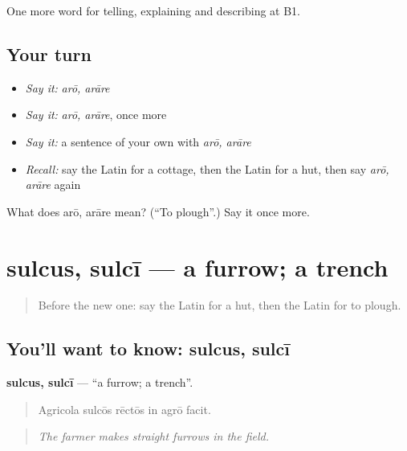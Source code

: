\begin{grammarlens}[title={What you've built}]
One more word for telling, explaining and describing at B1.
\end{grammarlens}

\subsection*{Your turn}
\begin{itemize}
\raggedright
  \item \emph{Say it:} \emph{arō, arāre}
  \item \emph{Say it:} \emph{arō, arāre}, once more
  \item \emph{Say it:} a sentence of your own with \emph{arō, arāre}
  \item \emph{Recall:} say the Latin for a cottage, then the Latin for a hut, then say \emph{arō, arāre} again
\end{itemize}

\begin{tcolorbox}[breakable,colback=teal!4,colframe=teal!35!black,title={Before you move on}]
What does arō, arāre mean? (\textquotedblleft{}To plough\textquotedblright{}.) Say it once more.
\end{tcolorbox}
\section[sulcus, sulcī]{sulcus, sulcī — a furrow; a trench}

\label{lesson:LA-C474-sulcus}



\begin{quote}
Before the new one: say the Latin for a hut, then the Latin for to plough.
\end{quote}

\subsection*{You'll want to know: sulcus, sulcī}
\textbf{sulcus, sulcī} — \textquotedblleft{}a furrow; a trench\textquotedblright{}.

\begin{quote}
Agricola sulcōs rēctōs in agrō facit.
\end{quote}

\begin{quote}
\emph{The farmer makes straight furrows in the field.}
\end{quote}

